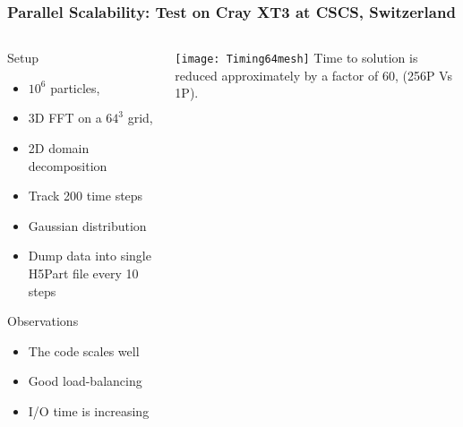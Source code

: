 \documentclass[xcolor=pdftex,table,10pt,yellow,mathserif]{beamer}
\begin{document}
\begin{frame} 
  \frametitle{Parallel Scalability: \small{Test on Cray XT3 at CSCS, Switzerland}}
  \begin{columns}
    \begin{column}{4.cm}
      \scriptsize
      \begin{block}{Setup}
        \begin{itemize}
        \item  \alert{$10^6$} particles, 
        \item 3D FFT on a  \alert{$64^3$} grid,
	\item \alert{2D} domain decomposition
	\item Track  \alert{200} time steps
        \item Gaussian distribution
	\item Dump data into \alert{single} H5Part file every 10 steps
        \end{itemize}
      \end{block}
      
      \begin{block}{Observations}
        \begin{itemize}
        \item The code scales well
	\item Good load-balancing
	\item I/O time is increasing 
        \end{itemize}
      \end{block}
    \end{column}
    \begin{column}{6.5cm}
      \texttt{[image: Timing64mesh]}
      \center Time to solution is reduced approximately by a factor of \alert{60}, (256P Vs 1P).
    \end{column}
  \end{columns}
\end{frame}
\end{document}
